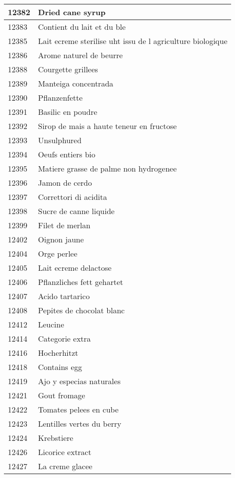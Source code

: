 \begin{longtable}{|l|l|}
12382 & Dried cane syrup \\ \hline 
12383 & Contient du lait et du ble \\ \hline 
12385 & Lait ecreme sterilise uht issu de l agriculture biologique \\ \hline 
12386 & Arome naturel de beurre \\ \hline 
12388 & Courgette grillees \\ \hline 
12389 & Manteiga concentrada \\ \hline 
12390 & Pflanzenfette \\ \hline 
12391 & Basilic en poudre \\ \hline 
12392 & Sirop de mais a haute teneur en fructose \\ \hline 
12393 & Unsulphured \\ \hline 
12394 & Oeufs entiers bio \\ \hline 
12395 & Matiere grasse de palme non hydrogenee \\ \hline 
12396 & Jamon de cerdo \\ \hline 
12397 & Correttori di acidita \\ \hline 
12398 & Sucre de canne liquide \\ \hline 
12399 & Filet de merlan \\ \hline 
12402 & Oignon jaune \\ \hline 
12404 & Orge perlee \\ \hline 
12405 & Lait ecreme delactose \\ \hline 
12406 & Pflanzliches fett gehartet \\ \hline 
12407 & Acido tartarico \\ \hline 
12408 & Pepites de chocolat blanc \\ \hline 
12412 & Leucine \\ \hline 
12414 & Categorie extra \\ \hline 
12416 & Hocherhitzt \\ \hline 
12418 & Contains egg \\ \hline 
12419 & Ajo y especias naturales \\ \hline 
12421 & Gout fromage \\ \hline 
12422 & Tomates pelees en cube \\ \hline 
12423 & Lentilles vertes du berry \\ \hline 
12424 & Krebstiere \\ \hline 
12426 & Licorice extract \\ \hline 
12427 & La creme glacee \\ \hline 

\end{longtable}
